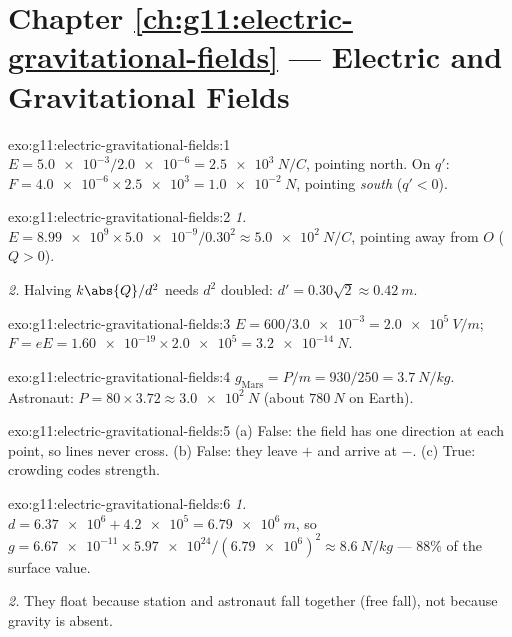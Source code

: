 \section*{Chapter \ref{ch:g11:electric-gravitational-fields} --- Electric and Gravitational Fields}

\begin{solution}{exo:g11:electric-gravitational-fields:1}
$E = \num{5.0e-3} / \num{2.0e-6} = \qty{2.5e3}{N/C}$, pointing north.
On $q'$: $F = \num{4.0e-6} \times \num{2.5e3} = \qty{1.0e-2}{N}$,
pointing \emph{south} ($q' < 0$).
\end{solution}

\begin{solution}{exo:g11:electric-gravitational-fields:2}
\emph{1.} $E = \num{8.99e9} \times \num{5.0e-9} / 0.30^2
\approx \qty{5.0e2}{N/C}$, pointing away from $O$ ($Q > 0$).

\emph{2.} Halving $k\abs{Q}/d^2$ needs $d^2$ doubled:
$d' = 0.30\sqrt{2} \approx \qty{0.42}{m}$.
\end{solution}

\begin{solution}{exo:g11:electric-gravitational-fields:3}
$E = 600 / \num{3.0e-3} = \qty{2.0e5}{V/m}$;
$F = eE = \num{1.60e-19} \times \num{2.0e5} = \qty{3.2e-14}{N}$.
\end{solution}

\begin{solution}{exo:g11:electric-gravitational-fields:4}
$g_{\text{Mars}} = P/m = 930/250 = \qty{3.7}{N/kg}$. Astronaut:
$P = 80 \times 3.72 \approx \qty{3.0e2}{N}$ (about $\qty{780}{N}$ on
Earth).
\end{solution}

\begin{solution}{exo:g11:electric-gravitational-fields:5}
(a) False: the field has one direction at each point, so lines never
cross. (b) False: they leave $+$ and arrive at $-$. (c) True: crowding
codes strength.
\end{solution}

\begin{solution}{exo:g11:electric-gravitational-fields:6}
\emph{1.} $d = \num{6.37e6} + \num{4.2e5} = \qty{6.79e6}{m}$, so
$g = \num{6.67e-11} \times \num{5.97e24} / (\num{6.79e6})^2
\approx \qty{8.6}{N/kg}$ --- $88\%$ of the surface value.

\emph{2.} They float because station and astronaut fall together (free
fall), not because gravity is absent.
\end{solution}

